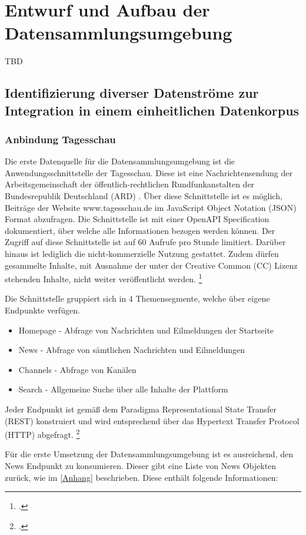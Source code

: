 \newpage
\section{Entwurf und Aufbau der Datensammlungsumgebung}
TBD

\subsection{Identifizierung diverser Datenströme zur Integration in einem einheitlichen Datenkorpus}
\subsubsection{Anbindung Tagesschau}
Die erste Datenquelle für die Datensammlungsumgebung ist die Anwendungsschnittstelle der Tagesschau. Diese ist eine Nachrichtensendung der Arbeitsgemeinschaft der öffentlich-rechtlichen Rundfunkanstalten der Bundesrepublik Deutschland (ARD) . Über diese Schnittstelle ist es möglich, Beiträge der Website www.tagesschau.de im JavaScript Object Notation (JSON) Format abzufragen. 
Die Schnittstelle ist mit einer OpenAPI Specification dokumentiert, über welche alle Informationen bezogen werden können. Der Zugriff auf diese Schnittstelle ist auf 60 Aufrufe pro Stunde limitiert. Darüber hinaus ist lediglich die nicht-kommerzielle Nutzung gestattet. Zudem dürfen gesammelte Inhalte, mit Ausnahme der unter der Creative Common (CC) Lizenz stehenden Inhalte, nicht weiter veröffentlicht werden. \footcite [Vgl.][]{Fischer.2024}

Die Schnittstelle gruppiert sich in 4 Themensegmente, welche über eigene Endpunkte verfügen. 
\begin{itemize}
    \item Homepage - Abfrage von Nachrichten und Eilmeldungen der Startseite
    \item News - Abfrage von sämtlichen Nachrichten und Eilmeldungen
    \item Channels - Abfrage von Kanälen
    \item Search - Allgemeine Suche über alle Inhalte der Plattform
\end{itemize}
Jeder Endpunkt ist gemäß dem Paradigma Representational State Transfer (REST) konstruiert und wird entsprechend über das Hypertext Transfer Protocol (HTTP) abgefragt. \footcite [Vgl.][]{Fischer.2024}
\newpage

Für die erste Umsetzung der Datensammlungsumgebung ist es ausreichend, den News Endpunkt zu konsumieren. Dieser gibt eine Liste von News Objekten zurück, wie im \ref{Anhang} beschrieben. Diese enthält folgende Informationen:

